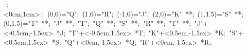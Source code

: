 
\hbox{
\xy    <1cm,0cm>:<0cm,1cm>::
       (0,0)="Q";  (1,0)="R";  (-1,0)="J";  (2,0)="K" **\dir{-};
       (1,1.5)="S" **\dir{-};  (0,1.5)="T" **\dir{-}; "J" **\dir{-};
       "T"; "Q" **\dir{-};  "S" **\dir{-}; "R" **\dir{-};
       "T" **\dir{-};  
       "J"+<-0.5em,-1.5ex> *{J};
       "T"+<-0.5em,1.5ex> *{T};
       "K"+<0.5em,-1.5ex> *{K};
       "S"+<0.5em,1.5ex> *{S};
       "Q"+<0em,-1.5ex> *{Q};
       "R"+<0em,-1.5ex> *{R};
       \endxy}
	   
